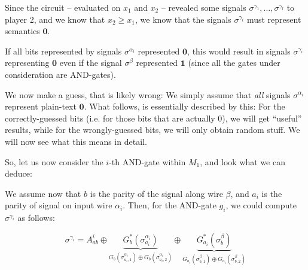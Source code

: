 
Since the circuit -- evaluated on $x_1$ and $x_2$ -- revealed some signals $\sigma^{\gamma_1},\dots,\sigma^{\gamma_l}$ to player 2, and we know that $x_2\geq x_1$, we know that the signals $\sigma^{\gamma_i}$ must represent semantics $\mathbf{0}$.


If all bits represented by signals $\sigma^{\alpha_i}$ represented $\mathbf{0}$, this would result in signals $\sigma^{\gamma_i}$ representing $\mathbf{0}$ even if the signal $\sigma^\beta$ represented $\mathbf{1}$ (since all the gates under consideration are AND-gates).


We now make a guess, that is likely wrong: We simply assume that \emph{all} signals $\sigma^{\alpha_i}$ represent plain-text $\mathbf{0}$. What follows, is essentially described by this: For the correctly-guessed bits (i.e. for those bits that are actually 0), we will get ``useful'' results, while for the wrongly-guessed bits, we will only obtain random stuff. We will now see what this means in detail.

So, let us now consider the $i$-th AND-gate within $M_1$, and look what we can deduce: 


We assume now that $b$ is the parity of the signal along wire $\beta$, and $a_i$ is the parity of signal on input wire $\alpha_i$. Then, for the AND-gate $g_i$, we could compute $\sigma^{\gamma_i}$ as follows:

\begin{equation}
  \label{eq:tricky-equation-for-outgoing-signals}
  \sigma^{\gamma_i} = A^i_{ab} \oplus \underbrace{G^*_b(\sigma^{\alpha_i}_{a_i})}_{G_b(\sigma^{\alpha_i}_{a_i,1}) \oplus G_b(\sigma^{\alpha_i}_{a_i,2})} \oplus \underbrace{G^*_{a_i}(\sigma^\beta_b)}_{G_{a_i}(\sigma^\beta_{b,1}) \oplus G_{a_i}(\sigma^\beta_{b,2})}
\end{equation}

